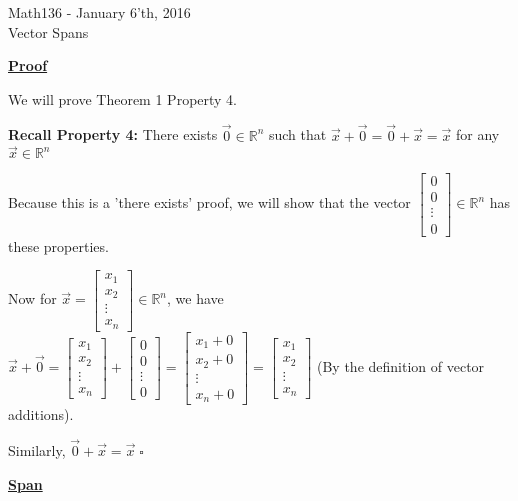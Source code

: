 \documentclass{letter}
\begin{document}
	\begin{center}
		\LARGE Math136 - January 6'th, 2016\\
		\large Vector Spans
	\end{center}
	\vspace{0.25 in}
	
	\underline{\textbf{Proof}}
	
	We will prove Theorem 1 Property 4.
	
	\textbf{Recall Property 4: } There exists $\vec 0 \in \mathbb{R}^n$ such that $\vec x + \vec 0 = \vec 0 + \vec x = \vec x$ for any $\vec x \in \mathbb{R}^n$
	
	Because this is a 'there exists' proof, we will show that the vector $\begin{bmatrix}0\\0\\\vdots\\0\end{bmatrix} \in \mathbb{R}^n$ has these properties.
	
	Now for $\vec x = \begin{bmatrix}x_1\\x_2\\\vdots\\x_n\end{bmatrix} \in \mathbb{R}^n$, we have $\vec x + \vec 0 = \begin{bmatrix}x_1\\x_2\\\vdots\\x_n\end{bmatrix} + \begin{bmatrix}0\\0\\\vdots\\0\end{bmatrix} = \begin{bmatrix}x_1 + 0\\x_2 + 0\\\vdots\\x_n + 0\end{bmatrix} = \begin{bmatrix} x_1\\x_2\\\vdots\\x_n\end{bmatrix}$ (By the definition of vector additions).
	
	Similarly, $\vec 0 + \vec x = \vec x \; \square$
	
	\underline{\textbf{Span}}
	
\end{document}
